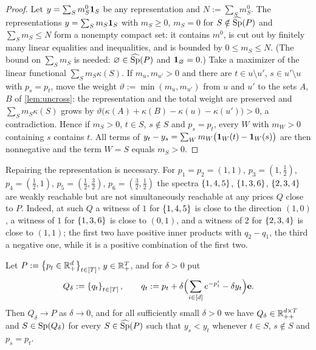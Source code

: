 \begin{proof}
Let $y=\sum_Sm^0_S\ind S$ be any representation and $N:=\sum_Sm^0_S$. The representations $y=\sum_Sm_S\ind S$ with $m_S\ge0$, $m_S=0$ for $S\notin\wSp(P)$ and $\sum_Sm_S\le N$ form a nonempty compact set: it contains $m^0$, is cut out by finitely many linear equalities and inequalities, and is bounded by $0\le m_S\le N$. (The bound on $\sum_Sm_S$ is needed: $\varnothing\in\wSp(P)$ and $\ind\varnothing=0$.) Take a maximizer of the linear functional $\sum_Sm_S\kappa(S)$. If $m_u,m_{u'}>0$ and there are $t\in u\setminus u'$, $s\in u'\setminus u$ with $p_s=p_t$, move the weight $\vartheta:=\min(m_u,m_{u'})$ from $u$ and $u'$ to the sets $A$, $B$ of \cref{lem:uncross}: the representation and the total weight are preserved and $\sum_Sm_S\kappa(S)$ grows by $\vartheta\bigl(\kappa(A)+\kappa(B)-\kappa(u)-\kappa(u')\bigr)>0$, a contradiction. Hence if $m_S>0$, $t\in S$, $s\notin S$ and $p_s=p_t$, every $W$ with $m_W>0$ containing $s$ contains $t$. All terms of $y_t-y_s=\sum_Wm_W\bigl(\ind W(t)-\ind W(s)\bigr)$ are then nonnegative and the term $W=S$ equals $m_S>0$.
\end{proof}

\begin{remark}
Repairing the representation is necessary. For $p_1=p_2=(1,1)$, $p_3=(1,\tfrac12)$, $p_4=(\tfrac12,1)$, $p_5=(\tfrac12,\tfrac32)$, $p_6=(\tfrac32,\tfrac12)$ the spectra $\set{1,4,5}$, $\set{1,3,6}$, $\set{2,3,4}$ are weakly reachable but are not simultaneously reachable at any prices $Q$ close to $P$. Indeed, at such $Q$ a witness of $1$ for $\set{1,4,5}$ is close to the direction $(1,0)$, a witness of $1$ for $\set{1,3,6}$ is close to $(0,1)$, and a witness of $2$ for $\set{2,3,4}$ is close to $(1,1)$; the first two have positive inner products with $q_2-q_1$, the third a negative one, while it is a positive combination of the first two.
\end{remark}

\begin{lemma}[tilt]\label{lem:tilt}
Let $P:=\set{p_t\in\Rp[d]}_{t\in[T]}$, $y\in\Rp[T]$, and for $\delta>0$ put
\[
Q_\delta:=\set{q_t}_{t\in[T]},\qquad q_t:=p_t+\delta\Bigl(\sum_{i\in[d]}e^{-p^i_t}-\delta y_t\Bigr)\e .
\]
Then $Q_\delta\to P$ as $\delta\to0$, and for all sufficiently small $\delta>0$ we have $Q_\delta\in\Rpp[d\times T]$ and $S\in\Sp(Q_\delta)$ for every $S\in\wSp(P)$ such that $y_s<y_t$ whenever $t\in S$, $s\notin S$ and $p_s=p_t$.
\end{lemma}

